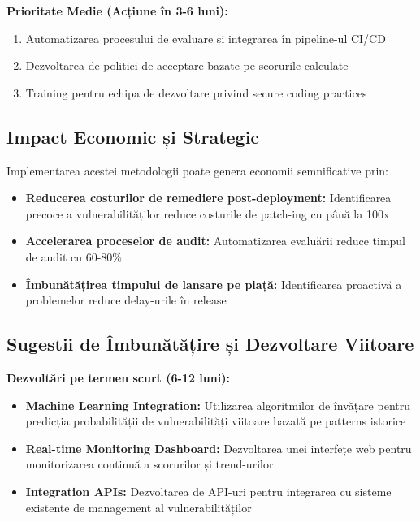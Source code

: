 \documentclass[12pt,a4paper]{article}
\begin{document}
\textbf{Prioritate Medie (Acțiune în 3-6 luni):}
\begin{enumerate}
\item Automatizarea procesului de evaluare și integrarea în pipeline-ul CI/CD
\item Dezvoltarea de politici de acceptare bazate pe scorurile calculate
\item Training pentru echipa de dezvoltare privind secure coding practices
\end{enumerate}

\subsection{Impact Economic și Strategic}

Implementarea acestei metodologii poate genera economii semnificative prin:

\begin{itemize}
\item \textbf{Reducerea costurilor de remediere post-deployment:} Identificarea precoce a vulnerabilităților reduce costurile de patch-ing cu până la 100x
\item \textbf{Accelerarea proceselor de audit:} Automatizarea evaluării reduce timpul de audit cu 60-80\%
\item \textbf{Îmbunătățirea timpului de lansare pe piață:} Identificarea proactivă a problemelor reduce delay-urile în release
\end{itemize}

\subsection{Sugestii de Îmbunătățire și Dezvoltare Viitoare}

\textbf{Dezvoltări pe termen scurt (6-12 luni):}

\begin{itemize}
\item \textbf{Machine Learning Integration:} Utilizarea algoritmilor de învățare pentru predicția probabilității de vulnerabilități viitoare bazată pe patterns istorice
\item \textbf{Real-time Monitoring Dashboard:} Dezvoltarea unei interfețe web pentru monitorizarea continuă a scorurilor și trend-urilor
\item \textbf{Integration APIs:} Dezvoltarea de API-uri pentru integrarea cu sisteme existente de management al vulnerabilităților
\end{itemize}
\end{document}
